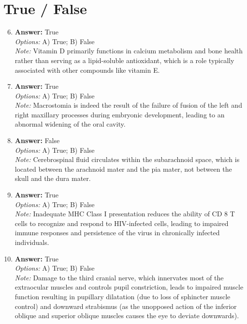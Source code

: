 \documentclass[12pt]{article}
\begin{document}
\section*{True / False}
\begin{enumerate}[label=\arabic*.]
\setcounter{enumi}{5}
\item \textbf{Answer:} True
\\ \textit{Options:} A) True; B) False
\\ \textit{Note:} Vitamin D primarily functions in calcium metabolism and bone health rather than serving as a lipid-soluble antioxidant, which is a role typically associated with other compounds like vitamin E.
\item \textbf{Answer:} True
\\ \textit{Options:} A) True; B) False
\\ \textit{Note:} Macrostomia is indeed the result of the failure of fusion of the left and right maxillary processes during embryonic development, leading to an abnormal widening of the oral cavity.
\item \textbf{Answer:} False
\\ \textit{Options:} A) True; B) False
\\ \textit{Note:} Cerebrospinal fluid circulates within the subarachnoid space, which is located between the arachnoid mater and the pia mater, not between the skull and the dura mater.
\item \textbf{Answer:} True
\\ \textit{Options:} A) True; B) False
\\ \textit{Note:} Inadequate MHC Class I presentation reduces the ability of CD 8 T cells to recognize and respond to HIV-infected cells, leading to impaired immune responses and persistence of the virus in chronically infected individuals.
\item \textbf{Answer:} True
\\ \textit{Options:} A) True; B) False
\\ \textit{Note:} Damage to the third cranial nerve, which innervates most of the extraocular muscles and controls pupil constriction, leads to impaired muscle function resulting in pupillary dilatation (due to loss of sphincter muscle control) and downward strabismus (as the unopposed action of the inferior oblique and superior oblique muscles causes the eye to deviate downwards).
\end{enumerate}
\end{document}
